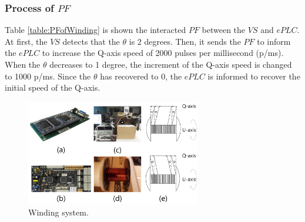 \documentclass[journal,UTF8]{IEEEtran}
\begin{document}
\subsubsection{Process of $PF$}
Table \ref{table:PFofWinding} is shown the interacted $PF$ between the $VS$ and $ePLC$. At first, the $VS$ detects that the $\theta$ is 2 degrees. Then, it sends the $PF$ to inform the $ePLC$ to increase the Q-axis speed of 2000 pulses per millisecond (p/ms). When the $\theta$ decreases to 1 degree, the increment of the Q-axis speed is changed to 1000 p/ms. Since the $\theta$ has recovered to 0, the $ePLC$ is informed to recover the initial speed of the Q-axis.  
\begin{figure}
	\centering
	\includegraphics[width=3in]{fig/Winding.pdf}
	\caption{ 
		Winding system.
	}
	\label{fig:Winding}
\end{figure}
\end{document}
